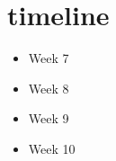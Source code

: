 \section{timeline}

\begin{itemize}
    \item{Week 7}
    \item{Week 8}
    \item{Week 9}
    \item{Week 10}
\end{itemize}
